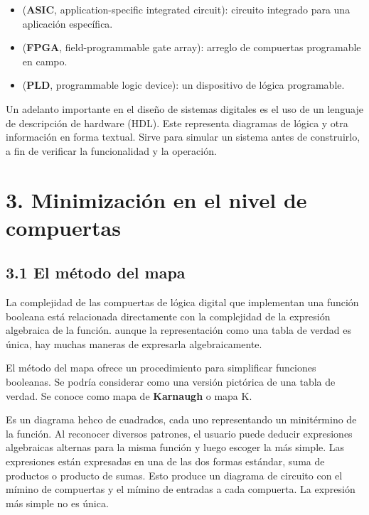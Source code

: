 \documentclass{article}
\begin{document}
\begin{itemize}
    \item (\textbf{ASIC}, application-specific integrated circuit): circuito integrado para una aplicaci\'{o}n espec\'{i}fica.
    \item (\textbf{FPGA}, field-programmable gate array): arreglo de compuertas programable en campo.
    \item (\textbf{PLD}, programmable logic device): un dispositivo de l\'{o}gica programable.
\end{itemize}

Un adelanto importante en el dise\~{n}o de sistemas digitales es el uso de un lenguaje de descripci\'{o}n
de hardware (HDL). Este representa diagramas de l\'{o}gica y otra informaci\'{o}n en forma textual. Sirve
para simular un sistema antes de construirlo, a fin de verificar la funcionalidad y la operaci\'{o}n.
\newpage

\section*{3. Minimizaci\'{o}n en el nivel de compuertas}
\subsection*{3.1 El m\'{e}todo del mapa}

La complejidad de las compuertas de l\'{o}gica digital que implementan una funci\'{o}n booleana est\'{a}
relacionada directamente con la complejidad de la expresi\'{o}n algebraica de la funci\'{o}n. aunque la 
representaci\'{o}n como una tabla de verdad es \'{u}nica, hay muchas maneras de expresarla algebraicamente.

El m\'{e}todo del mapa ofrece un procedimiento para simplificar funciones booleanas. Se podr\'{i}a considerar
como una versi\'{o}n pict\'{o}rica de una tabla de verdad. Se conoce como mapa de \textbf{Karnaugh} o mapa K.

Es un diagrama hehco de cuadrados, cada uno representando un minit\'{e}rmino de la funci\'{o}n. Al reconocer
diversos patrones, el usuario puede deducir expresiones algebraicas alternas para la misma funci\'{o}n y luego
escoger la m\'{a}s simple. Las expresiones est\'{a}n expresadas en una de las dos formas est\'{a}ndar, suma de
productos o producto de sumas. Esto produce un diagrama de circuito con el m\'{i}mino de compuertas y el m\'{i}mino
de entradas a cada compuerta. La expresi\'{o}n m\'{a}s simple no es \'{u}nica.
\end{document}
